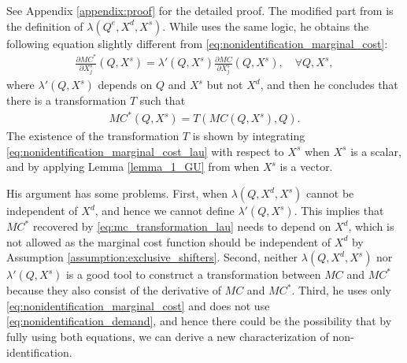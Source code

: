 \documentclass[11pt, a4paper]{article}
\theoremstyle{remark}
\begin{document}
See Appendix \ref{appendix:proof} for the detailed proof.
The modified part from \citet{lau1982identifying} is the definition of $\lambda(Q^e, X^{d}, X^{s})$.
While \citet{lau1982identifying} uses the same logic, he obtains the following equation slightly different from \eqref{eq:nonidentification_marginal_cost}:
\begin{align}
    \frac{\partial MC^{*}}{\partial X^{s}_j}(Q, X^{s}) = \lambda'(Q, X^{s}) \frac{\partial MC}{\partial X^{s}_j}(Q, X^{s}),\quad \forall Q, X^{s}, \label{eq:nonidentification_marginal_cost_lau}
\end{align}
where $\lambda'(Q, X^{s})$ depends on $Q$ and $X^{s}$ but not $X^{d}$, and then he concludes that there is a transformation $T$ such that 
\begin{align}
    MC^{*}(Q, X^{s}) = T(MC(Q, X^{s}), Q). \label{eq:mc_transformation_lau}
\end{align}
The existence of the transformation $T$ is shown by integrating \eqref{eq:nonidentification_marginal_cost_lau} with respect to $X^{s}$ when $X^{s}$ is a scalar, and by applying Lemma \ref{lemma_1_GU} from \citet{goldmanNote1964} when $X^{s}$ is a vector.

His argument has some problems.
First, when $\lambda(Q, X^{d}, X^{s})$ cannot be independent of $X^{d}$, and hence we cannot define $\lambda'(Q, X^{s})$.
This implies that  $MC^{*}$ recovered by \eqref{eq:mc_transformation_lau} needs to depend on $X^{d}$, which is not allowed as the marginal cost function should be independent of $X^{d}$ by Assumption \ref{assumption:exclusive_shifters}.
Second, neither $\lambda(Q, X^{d}, X^{s})$ nor $\lambda'(Q, X^{s})$ is a good tool to construct a transformation between $MC$ and $MC^{*}$ because they also consist of the derivative of $MC$ and $MC^{*}$.
Third, he uses only \eqref{eq:nonidentification_marginal_cost} and does not use \eqref{eq:nonidentification_demand}, and hence there could be the possibility that by fully using both equations, we can derive a new characterization of non-identification.
\end{document}
